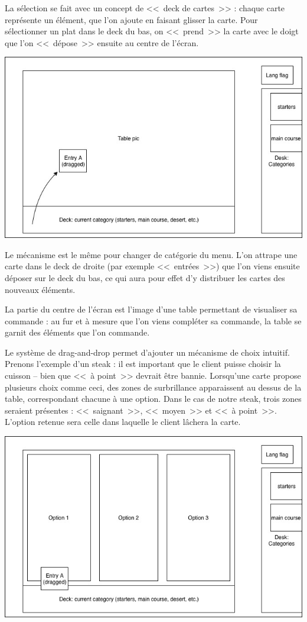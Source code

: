 \documentclass[a4paper,12pt]{article}
\begin{document}
La sélection se fait avec un concept de <<~deck de cartes~>> : chaque carte représente un élément, que l'on ajoute
en faisant glisser la carte. Pour sélectionner un plat dans le deck du bas, on <<~prend~>> la carte avec le doigt que
l'on <<~dépose~>> ensuite au centre de l'écran.

\begin{center}
	\includegraphics[width=\textwidth]{in_place_drag.jpg}
\end{center}

Le mécanisme est le même pour changer de catégorie du menu. L'on attrape une carte dans le deck de droite (par
exemple <<~entrées~>>) que l'on viens ensuite déposer sur le deck du bas, ce qui aura pour effet d'y distribuer
les cartes des nouveaux éléments.

La partie du centre de l'écran est l'image d'une table permettant de visualiser sa commande : au fur et à mesure que
l'on viens compléter sa commande, la table se garnit des éléments que l'on commande.

Le système de drag-and-drop permet d'ajouter un mécanisme de choix intuitif. Prenons l'exemple d'un steak : il est
important que le client puisse choisir la cuisson -- bien que <<~à point~>> devrait être bannie. Lorsqu'une carte
propose plusieurs choix comme ceci, des zones de surbrillance apparaissent au dessus de la table, correspondant
chacune à une option. Dans le cas de notre steak, trois zones seraient présentes : <<~saignant~>>, <<~moyen~>> et
<<~à point~>>. L'option retenue sera celle dans laquelle le client lâchera la carte.

\begin{center}
	\includegraphics[width=\textwidth]{in_place_drag_options.jpg}
\end{center}
\end{document}
